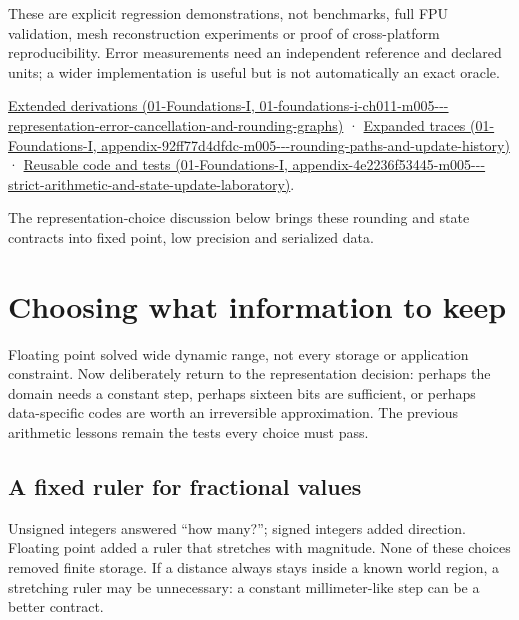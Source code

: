 These are explicit regression demonstrations, not benchmarks, full FPU validation, mesh reconstruction experiments or proof of cross-platform reproducibility. Error measurements need an independent reference and declared units; a wider implementation is useful but is not automatically an exact oracle.

\href{../01-Foundations-I/main.pdf\#nameddest=01-foundations-i-ch011-m005---representation-error-cancellation-and-rounding-graphs}{Extended derivations (01-Foundations-I, 01-foundations-i-ch011-m005-\/-\/-representation-error-cancellation-and-rounding-graphs)} · \href{../01-Foundations-I/main.pdf\#nameddest=appendix-92ff77d4dfdc-m005---rounding-paths-and-update-history}{Expanded traces (01-Foundations-I, appendix-92ff77d4dfdc-m005-\/-\/-rounding-paths-and-update-history)} · \href{../01-Foundations-I/main.pdf\#nameddest=appendix-4e2236f53445-m005---strict-arithmetic-and-state-update-laboratory}{Reusable code and tests (01-Foundations-I, appendix-4e2236f53445-m005-\/-\/-strict-arithmetic-and-state-update-laboratory)}.

The representation-choice discussion below brings these rounding and state contracts into fixed point, low precision and serialized data.

\section{Choosing what information to keep}\label{05-engine-i-ch001-choosing-what-information-to-keep}

Floating point solved wide dynamic range, not every storage or application constraint. Now deliberately return to the representation decision: perhaps the domain needs a constant step, perhaps sixteen bits are sufficient, or perhaps data-specific codes are worth an irreversible approximation. The previous arithmetic lessons remain the tests every choice must pass.

\subsection{A fixed ruler for fractional values}\label{05-engine-i-ch001-a-fixed-ruler-for-fractional-values}

Unsigned integers answered ``how many?''; signed integers added direction. Floating point added a ruler that stretches with magnitude. None of these choices removed finite storage. If a distance always stays inside a known world region, a stretching ruler may be unnecessary: a constant millimeter-like step can be a better contract.

